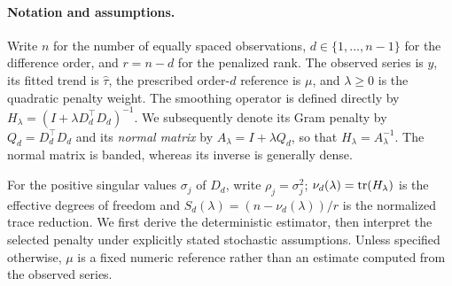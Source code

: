\paragraph{Notation and assumptions.}
Write $n$ for the number of equally spaced observations,
$d\in\{1,\ldots,n-1\}$ for the difference order,
and $r=n-d$ for the penalized rank.  The observed
series is $y$, its fitted trend is $\widehat\tau$,
the prescribed order-$d$ reference is $\mu$,
and $\lambda\geq0$ is the quadratic penalty
weight.  The smoothing operator is defined directly by
$H_\lambda=(I+\lambda D_d^\top D_d)^{-1}$.
We subsequently denote its Gram penalty by
$Q_d=D_d^\top D_d$ and its \emph{normal matrix}
by $A_\lambda=I+\lambda Q_d$, so that
$H_\lambda=A_\lambda^{-1}$.
The normal matrix is banded, whereas its inverse
is generally dense.

For the positive singular values $\sigma_j$ of
$D_d$, write $\rho_j=\sigma_j^2$;
$\nu_d(\lambda)=\operatorname{tr}(H_\lambda)$ is the effective
degrees of freedom and
$S_d(\lambda)=(n-\nu_d(\lambda))/r$
is the normalized trace reduction.  We first
derive the deterministic estimator, then interpret
the selected penalty under explicitly stated
stochastic assumptions.  Unless specified otherwise,
$\mu$ is a fixed numeric reference rather than
an estimate computed from the observed series.
